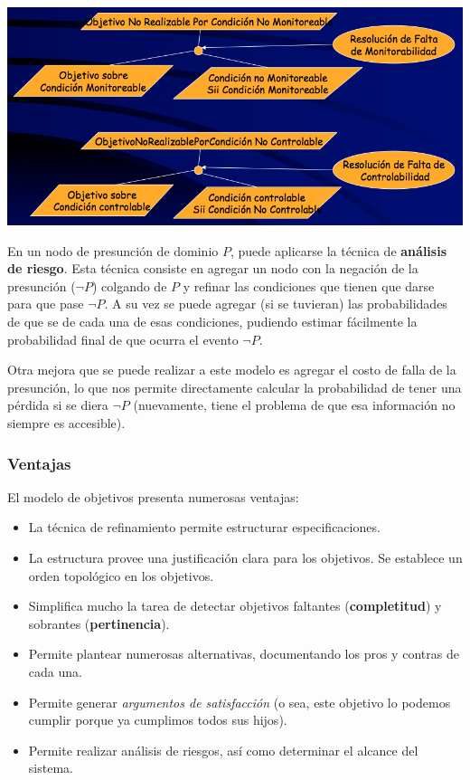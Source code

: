 \documentclass[]{article}
\begin{document}
\begin{center}
	\includegraphics[scale=0.45]{CondNo.png}
\end{center}

En un nodo de presunción de dominio $P$, puede aplicarse la técnica de \textbf{análisis de riesgo}. Esta técnica consiste en agregar un nodo con la negación de la presunción ($\neg P$) colgando de $P$ y refinar las condiciones que tienen que darse para que pase $\neg P$. A su vez se puede agregar (si se tuvieran) las probabilidades de que se de cada una de esas condiciones, pudiendo estimar fácilmente la probabilidad final de que ocurra el evento $\neg P$.

Otra mejora que se puede realizar a este modelo es agregar el costo de falla de la presunción, lo que nos permite directamente calcular la probabilidad de tener una pérdida si se diera $\neg P$ (nuevamente, tiene el problema de que esa información no siempre es accesible).

\subsubsection{Ventajas}
El modelo de objetivos presenta numerosas ventajas:
\begin{itemize}
	\item La técnica de refinamiento permite estructurar especificaciones.
	\item La estructura provee una justificación clara para los objetivos. Se establece un orden topológico en los objetivos.
	\item Simplifica mucho la tarea de detectar objetivos faltantes (\textbf{completitud}) y sobrantes (\textbf{pertinencia}).
	\item Permite plantear numerosas alternativas, documentando los pros y contras de cada una.
	\item Permite generar \textit{argumentos de satisfacción} (o sea, este objetivo lo podemos cumplir porque ya cumplimos todos sus hijos).
	\item Permite realizar análisis de riesgos, así como determinar el alcance del sistema.
\end{itemize}
\end{document}

